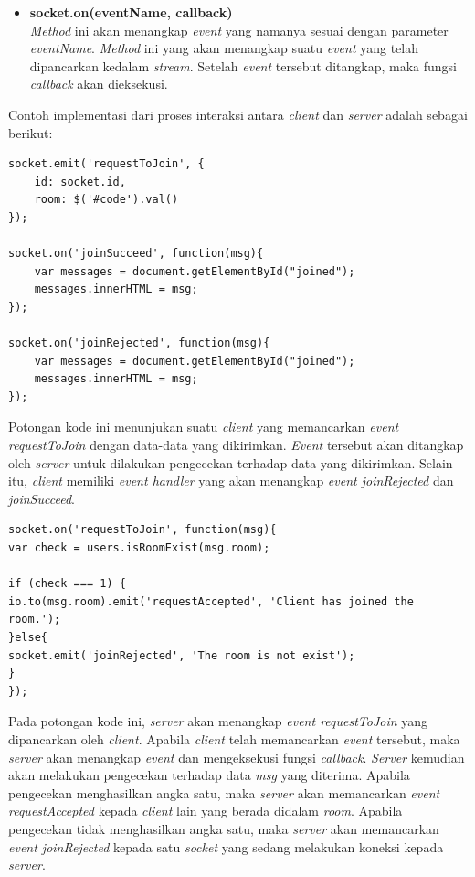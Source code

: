 \begin{enumerate}
\begin{itemize}
		\item \textbf{socket.on(eventName, callback)} \\
		\textit{Method} ini akan menangkap \textit{event} yang namanya sesuai dengan parameter \textit{eventName}. \textit{Method} ini yang akan menangkap suatu \textit{event} yang telah dipancarkan kedalam \textit{stream}. Setelah \textit{event} tersebut ditangkap, maka fungsi \textit{callback} akan dieksekusi.
	\end{itemize}
Contoh implementasi dari proses interaksi antara \textit{client} dan \textit{server} adalah sebagai berikut:
\begin{lstlisting}[caption={Potongan kode pada bagian \textit{client}}, label={lst:interaksi_client}, captionpos=b]
socket.emit('requestToJoin', {
	id: socket.id,
	room: $('#code').val()
});

socket.on('joinSucceed', function(msg){
	var messages = document.getElementById("joined");
	messages.innerHTML = msg;
});

socket.on('joinRejected', function(msg){
	var messages = document.getElementById("joined");
	messages.innerHTML = msg;
});
\end{lstlisting}
Potongan kode ini menunjukan suatu \textit{client} yang memancarkan \textit{event requestToJoin} dengan data-data yang dikirimkan. \textit{Event} tersebut akan ditangkap oleh \textit{server} untuk dilakukan pengecekan terhadap data yang dikirimkan. Selain itu, \textit{client} memiliki \textit{event handler} yang akan menangkap \textit{event joinRejected} dan \textit{joinSucceed}.


\begin{lstlisting}[caption={Potongan kode pada bagian \textit{server}}, label={lst:interaksi_server}, captionpos=b]
socket.on('requestToJoin', function(msg){
var check = users.isRoomExist(msg.room);

if (check === 1) {
io.to(msg.room).emit('requestAccepted', 'Client has joined the room.');
}else{
socket.emit('joinRejected', 'The room is not exist');
}
});
\end{lstlisting}
Pada potongan kode ini, \textit{server} akan menangkap \textit{event requestToJoin} yang dipancarkan oleh \textit{client}. Apabila \textit{client} telah memancarkan \textit{event} tersebut, maka \textit{server} akan menangkap \textit{event} dan mengeksekusi fungsi \textit{callback}. \textit{Server} kemudian akan melakukan pengecekan terhadap data \textit{msg} yang diterima. Apabila pengecekan menghasilkan angka satu, maka \textit{server} akan memancarkan \textit{event requestAccepted} kepada \textit{client} lain yang berada didalam \textit{room}. Apabila pengecekan tidak menghasilkan angka satu, maka \textit{server} akan memancarkan \textit{event joinRejected} kepada satu \textit{socket} yang sedang melakukan koneksi kepada \textit{server}.


\end{enumerate}

